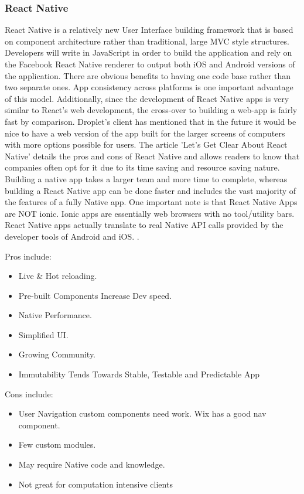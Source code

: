 \documentclass[draftclsnofoot, onecolumn, letterpaper,10pt,compsoc]{IEEEtran}
\begin{document}
\subsubsection{React Native}
React Native is a relatively new User Interface building framework that is based on component architecture rather than traditional, large MVC style structures. Developers will write in JavaScript in order to build the application and rely on the Facebook React Native renderer to output both iOS and Android versions of the application. There are obvious benefits to having one code base rather than two separate ones. App consistency across platforms is one important advantage of this model. Additionally, since the development of React Native apps is very similar to React's web development, the cross-over to building a web-app is fairly fast by comparison. Droplet's client has mentioned that in the future it would be nice to have a web version of the app built for the larger screens of computers with more options possible for users. The article 'Let's Get Clear About React Native' details the pros and cons of React Native and allows readers to know that companies often opt for it due to its time saving and resource saving nature. Building a native app takes a larger team and more time to complete, whereas building a React Native app can be done faster and includes the vast majority of the features of a fully Native app. One important note is that React Native Apps are NOT ionic. Ionic apps are essentially web browsers with no tool/utility bars. React Native apps actually translate to real Native API calls provided by the developer tools of Android and iOS. \cite{simplytechnologies}.


Pros include:
\begin{itemize}
    \item Live \& Hot reloading.
    \item Pre-built Components Increase Dev speed.
    \item Native Performance.
    \item Simplified UI.
    \item Growing Community.
    \item Immutability Tends Towards Stable, Testable and Predictable App
\end{itemize}

Cons include:
\begin{itemize}
    \item User Navigation custom components need work. Wix has a good nav component.
    \item Few custom modules.
    \item May require Native code and knowledge.
    \item Not great for computation intensive clients
\end{itemize}
\end{document}
